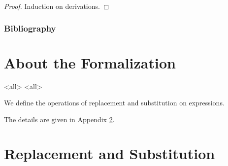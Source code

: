 \begin{proof}
Induction on derivations.
\end{proof}

\todos

\begin{frame}
\frametitle{Bibliography}

\end{frame}

\appendix

\section{About the Formalization}


\mode<all>{}
\mode<all>{}

We define the operations of replacement and substitution on
expressions.  




The details are given in Appendix \ref{appendix:repsub}.




%
%
%

\section{Replacement and Substitution}
\label{appendix:repsub}













